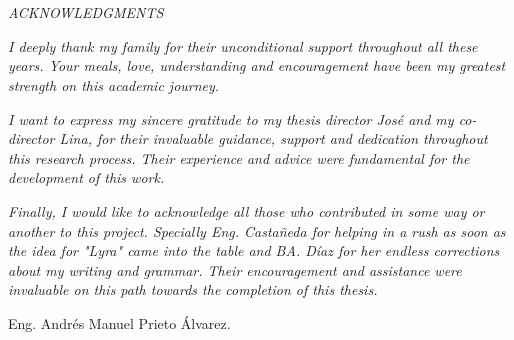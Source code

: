 \chapter*{}
\vspace{1cm}
\begin{center}
	\textit{ACKNOWLEDGMENTS}
\end{center}
\vspace{1.5cm}

\textit{I deeply thank my family for their unconditional support throughout all these years. Your meals, love, understanding and encouragement have been my greatest strength on this academic journey.}

\textit{I want to express my sincere gratitude to my thesis director José and my co-director Lina, for their invaluable guidance, support and dedication throughout this research process. Their experience and advice were fundamental for the development of this work.}

\textit{Finally, I would like to acknowledge all those who contributed in some way or another to this project. Specially Eng. Castañeda for helping in a rush as soon as the idea for "Lyra" came into the table and BA. Díaz for her endless corrections about my writing and grammar. Their encouragement and assistance were invaluable on this path towards the completion of this thesis.}
\vspace{1.0cm}
\begin{flushright}
	Eng. Andrés Manuel Prieto Álvarez.
\end{flushright}
